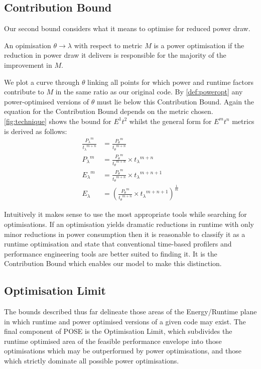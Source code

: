 \subsection{Contribution Bound}
Our second bound considers what it means to optimise for reduced power draw.

\begin{definition}
An opimisation $\theta \to \lambda$ with respect to metric $M$ is a power optimisation if the reduction in power draw it delivers is responsible for the majority of the improvement in $M$.
\label{def:poweropt}
\end{definition}

We plot a curve through $\theta$ linking all points for which power and runtime factors contribute to $M$ in the same ratio as our original code.
By \autoref{def:poweropt} any power-optimised versions of $\theta$ must lie below this Contribution Bound.
Again the equation for the Contribution Bound depends on the metric chosen. 
\autoref{fig:technique} shows the bound for $E^1t^2$ whilst the general form for $E^mt^n$ metrics is derived as follows:
\begin{align}
\frac{{P_{\lambda}}^m}{{t_{\lambda}}^{m+n}} &= \frac{{P_{\theta}}^m}{{t_{\theta}}^{m+n}} \nonumber \\
 {P_{\lambda}}^m &= \frac{{P_{\theta}}^m}{{t_{\theta}}^{m+n}} \times {t_\lambda}^{m+n} \nonumber \\ 
 {E_{\lambda}}^m &= \frac{{P_{\theta}}^m}{{t_{\theta}}^{m+n}} \times {t_\lambda}^{m+n+1} \nonumber \\ 
  E_{\lambda} &= (\frac{{P_{\theta}}^m}{{t_{\theta}}^{m+n}} \times {t_\lambda}^{m+n+1})^{\frac{1}{m}} 
\end{align}

Intuitively it makes sense to use the most appropriate tools while searching for optimisations.
If an optimisation yields dramatic reductions in runtime with only minor reductions in power consumption then it is reasonable to classify it as a runtime optimisation and state that conventional time-based profilers and performance engineering tools are better suited to finding it.
It is the Contribution Bound which enables our model to make this distinction.
\subsection{Optimisation Limit}
The bounds described thus far delineate those areas of the Energy/Runtime plane in which runtime and power optimised versions of a given code may exist.
The final component of POSE is the Optimisation Limit, which subdivides the runtime optimised area of the feasible performance envelope into those optimisations which may be outperformed by power optimisations, and those which strictly dominate all possible power optimisations.

